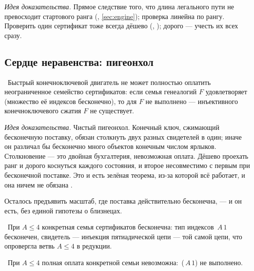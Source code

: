 \emph{Идея доказательства.} Прямое следствие того, что длина легального пути не превосходит
стартового ранга (, \cref{sec:engine}); проверка линейна по рангу. Проверить
один сертификат тоже всегда дёшево (, \green{}); дорого --- учесть их
всех сразу.

\subsection{Сердце неравенства: пигеонхол}

\begin{theorem}\label{thm:no_fullPayment_of_unboundedSupply}
\green{}\ Быстрый конечноключевой двигатель не может полностью оплатить неограниченное семейство
сертификатов: если семья генеалогий $F$ удовлетворяет 
(множество её индексов бесконечно), то  для $F$ не выполнено ---
инъективного конечноключевого сжатия $F$ не существует.
\end{theorem}

\emph{Идея доказательства.} Чистый пигеонхол. Конечный ключ, сжимающий бесконечную поставку, обязан
столкнуть двух разных свидетелей в один; иначе он различал бы бесконечно много объектов конечным
числом ярлыков. Столкновение --- это двойная бухгалтерия, невозможная оплата. Дёшево проехать ранг
и дорого коснуться каждого состояния, и второе несовместимо с первым при бесконечной поставке. Это
и есть зелёная теорема, из-за которой всё работает, и она ничем не обязана \axiom{}.

Осталось предъявить масштаб, где поставка действительно бесконечна, --- и он есть, без единой
гипотезы о близнецах.

\begin{theorem}\label{thm:concreteSupply_unbounded_smallScale}
\green{}\ При $A \le 4$ конкретная семья сертификатов бесконечна: тип индексов
\,$A\,1$ бесконечен, свидетель --- инъекция пятиадической цепи
 --- той самой цепи, что опровергла ветвь $A \le 4$ в редукции.
\end{theorem}

\begin{corollary}\label{thm:concrete_noFullPayment_smallScale}
\green{}\ При $A \le 4$ полная оплата конкретной семьи невозможна:
\,(\,$A\,1$) не выполнено.
\end{corollary}

